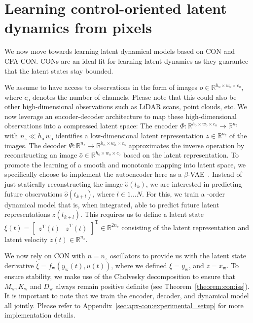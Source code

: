 \section{Learning control-oriented latent dynamics from pixels}\label{sec:learning_latent_space_dynamics}
We now move towards learning latent dynamical models based on \gls{CON} and \gls{CFA-CON}.
\glspl{CON} are an ideal fit for learning latent dynamics as they guarantee that the latent states stay bounded. 

We assume to have access to observations in the form of images $o \in \mathbb{R}^{h_\mathrm{o} \times w_\mathrm{o} \times c_\mathrm{o}}$, where $c_\mathrm{o}$ denotes the number of channels. Please note that this could also be other high-dimensional observations such as LiDAR scans, point clouds, etc.
We now leverage an encoder-decoder architecture to map these high-dimensional observations into a compressed latent space: %
The encoder $\Phi: \mathbb{R}^{h_\mathrm{o} \times w_\mathrm{o} \times c_\mathrm{o}} \to \mathbb{R}^{n_z} $ with $n_z \ll h_\mathrm{o} \,  w_\mathrm{o}$ identifies a low-dimensional latent representation $z \in \mathbb{R}^{n_z}$ of the images. The decoder $\Psi: \mathbb{R}^{n_z} \to \mathbb{R}^{h_\mathrm{o} \times w_\mathrm{o} \times c_\mathrm{o}}$ approximates the inverse operation by reconstructing an image $\hat{o} \in \mathbb{R}^{h_\mathrm{o} \times w_\mathrm{o} \times c_\mathrm{o}}$ based on the latent representation.
To promote the learning of a smooth and monotonic mapping into latent space, we specifically choose to implement the autoencoder here as a $\beta$-\gls{VAE}~\cite{kingma2014auto, higgins2017beta}.
Instead of just statically reconstructing the image $\hat{o}(t_k)$, we are interested in predicting future observations $\hat{o}(t_{k+l})$, where $l \in 1 \dots N$. For this, we train a -order dynamical model that is, when integrated, able to predict future latent representations $z(t_{k+l})$.
This requires us to define a latent state $\xi(t) = \begin{bmatrix}
    z^\mathrm{T}(t) & \dot{z}^\mathrm{T}(t)
\end{bmatrix}^\mathrm{T} \in \mathbb{R}^{2n_z}$ consisting of the latent representation and latent velocity $\dot{z}(t) \in \mathbb{R}^{n_z}$.

We now rely on \gls{CON} with $n = n_z$ oscillators to provide us with the latent state derivative $\dot{\xi}= f_\mathrm{w}(y_\mathrm{w}(t), u(t))$, where we defined $\xi = y_\mathrm{w}$, and $z = x_\mathrm{w}$. To ensure stability, we make use of the Cholvesky decomposition to ensure that $M_\mathrm{w}, K_\mathrm{w}$ and $D_\mathrm{w}$ always remain positive definite (see Theorem~\ref{theorem:con:iss}).
It is important to note that we train the encoder, decoder, and dynamical model all jointly.
Please refer to Appendix~\ref{sec:apx-con:experimental_setup} for more implementation details.

